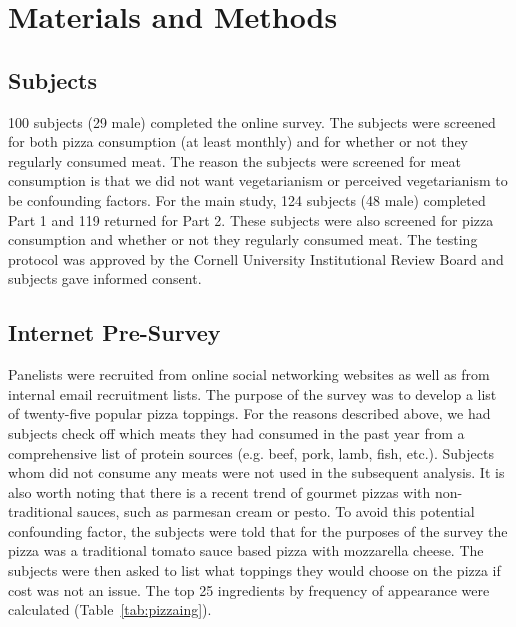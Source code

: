 \section{Materials and Methods}
\subsection{Subjects}
100 subjects (29  male) completed the online survey.  The subjects were screened for both pizza consumption (at least monthly) and for whether or not they regularly consumed meat.  The reason the subjects were screened for meat consumption is that we did not want vegetarianism or perceived vegetarianism to be confounding factors.  For the main study, 124 subjects (48 male) completed Part 1 and 119 returned for Part 2.  These subjects were also screened for pizza consumption and whether or not they regularly consumed meat. The testing protocol was approved by the Cornell University Institutional Review Board and subjects gave informed consent.  

\subsection{Internet Pre-Survey}
Panelists were recruited from online social networking websites as well as from internal email recruitment lists.  The purpose of the survey was to develop a list of twenty-five popular pizza toppings.  For the reasons described above, we had subjects check off which meats they had consumed in the past year from a comprehensive list of protein sources (e.g. beef, pork, lamb, fish, etc.).  Subjects whom did not consume any meats were not used in the subsequent analysis.  It is also worth noting that  there is a recent trend of gourmet pizzas with non-traditional sauces, such as parmesan cream or pesto.  To avoid this potential confounding factor, the subjects were told that for the purposes of the survey the pizza was a traditional tomato sauce based pizza with mozzarella cheese.  The subjects were then asked to list what toppings they would choose on the pizza if cost was not an issue.  The top 25 ingredients by frequency of appearance were calculated (Table~\ref{tab:pizzaing}).

